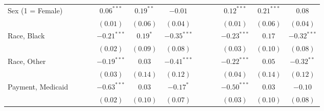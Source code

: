 \documentclass[12pt,twoside]{reedthesis}
\begin{document}
\begin{table}
\begin{center}
\begin{tiny}
\begin{tabular}{l@{} c@{} c@{} c@{} c@{} c@{} c@{} c@{} c@{} c@{} c@{} c@{} c@{} }
  Sex (1 = Female)   &                       &                        &                        & $\mathbf{0.06}^{***}$  & $\mathbf{0.19}^{**}$   & $-0.01$                &                        &                        &                        & $\mathbf{0.12}^{***}$  & $\mathbf{0.21}^{***}$  & $0.08$                 \\
                     &                       &                        &                        & $(0.01)$               & $(0.06)$               & $(0.04)$               &                        &                        &                        & $(0.01)$               & $(0.06)$               & $(0.04)$               \\
  Race, Black        &                       &                        &                        & $\mathbf{-0.21}^{***}$ & $0.19^{*}$             & $\mathbf{-0.35}^{***}$ &                        &                        &                        & $\mathbf{-0.23}^{***}$ & $0.17$                 & $\mathbf{-0.32}^{***}$ \\
                     &                       &                        &                        & $(0.02)$               & $(0.09)$               & $(0.08)$               &                        &                        &                        & $(0.03)$               & $(0.10)$               & $(0.08)$               \\
  Race, Other        &                       &                        &                        & $\mathbf{-0.19}^{***}$ & $0.03$                 & $\mathbf{-0.41}^{***}$ &                        &                        &                        & $\mathbf{-0.22}^{***}$ & $0.05$                 & $\mathbf{-0.32}^{**}$  \\
                     &                       &                        &                        & $(0.03)$               & $(0.14)$               & $(0.12)$               &                        &                        &                        & $(0.04)$               & $(0.14)$               & $(0.12)$               \\
  Payment, Medicaid  &                       &                        &                        & $\mathbf{-0.63}^{***}$ & $0.03$                 & $-0.17^{*}$            &                        &                        &                        & $\mathbf{-0.50}^{***}$ & $0.03$                 & $-0.10$                \\
                     &                       &                        &                        & $(0.02)$               & $(0.10)$               & $(0.07)$               &                        &                        &                        & $(0.03)$               & $(0.10)$               & $(0.08)$               \\

\end{tabular}
\end{tiny}
\end{center}
\end{table}
\end{document}
